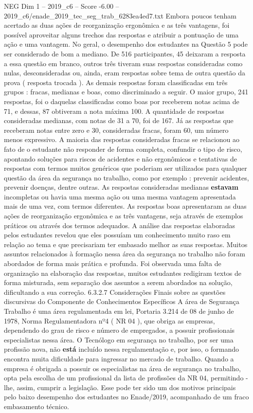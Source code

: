 \begin{textsample}{NEG Dim 1 – 2019\_c6 – Score -6.00 – 2019\_c6/enade\_2019\_tec\_seg\_trab\_6283ea4ed7.txt}
Embora poucos tenham acertado as duas ações de reorganização ergonômica e as três vantagens, foi possível aproveitar alguns trechos das respostas e atribuir a pontuação de uma ação e uma vantagem.
No geral, o desempenho dos estudantes na Questão 5 pode ser considerado de bom a mediano.
De 516 participantes, 45 deixaram a resposta a essa questão em branco, outros três tiveram suas respostas consideradas como nulas, desconsideradas ou, ainda, eram respostas sobre tema de outra questão da prova ( resposta trocada ).
As demais respostas foram classificadas em três grupos : fracas, medianas e boas, como discriminado a seguir.
O maior grupo, 241 respostas, foi o daquelas classificadas como boas por receberem notas acima de 71, e dessas, 87 obtiveram a nota máxima 100.
A quantidade de respostas consideradas medianas, com notas de 31 a 70, foi de 167.
Já as respostas que receberam notas entre zero e 30, consideradas fracas, foram 60, um número menos expressivo.
A maioria das respostas consideradas fracas se relacionou ao fato de o estudante não responder de forma completa, confundir o tipo de risco, apontando soluções para riscos de acidentes e não ergonômicos e tentativas de respostas com termos muitos genéricos que poderiam ser utilizados para qualquer questão da área da segurança no trabalho, como por exemplo : prevenir acidentes, prevenir doenças, dentre outras.
As respostas consideradas medianas \textbf{estavam} incompletas ou havia uma mesma ação ou uma mesma vantagem apresentada mais de uma vez, com termos diferentes.
As respostas boas apresentaram as duas ações de reorganização ergonômica e as três vantagens, seja através de exemplos práticos ou através dos termos adequados.
A análise das respostas elaboradas pelos estudantes revelou que eles possuíam um conhecimento muito raso em relação ao tema e que precisariam ter embasado melhor as suas respostas.
Muitos assuntos relacionados à formação nessa área da segurança no trabalho não foram abordados de forma mais prática e profunda.
Foi observada uma falta de organização na elaboração das respostas, muitos estudantes redigiram textos de forma misturada, sem separação dos assuntos a serem abordados na solução, dificultando a sua correção. 6.3.2.7 Considerações Finais sobre as questões discursivas do Componente de Conhecimentos Específicos A área de Segurança Trabalho é uma área regulamentada em lei, Portaria 3.214 de 08 de junho de 1978, Norma Regulamentadora nº4 ( NR 04 ), que obriga as empresas, dependendo do grau de risco e número de empregados, a possuir profissionais especialistas nessa área.
O Tecnólogo em segurança no trabalho, por ser uma profissão nova, não \textbf{está} incluído nessa regulamentação e, por isso, o formando encontra muita dificuldade para ingressar no mercado de trabalho.
Quando a empresa é obrigada a possuir os especialistas na área de segurança no trabalho, opta pela escolha de um profissional da lista de profissões da NR 04, permitindo -lhe, assim, cumprir a legislação.
Esse pode ter sido um dos motivos principais pelo baixo desempenho dos estudantes no Enade/2019, acompanhado de um fraco embasamento técnico.

\end{textsample}
